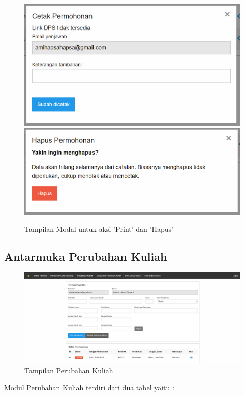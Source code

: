 \documentclass[a4paper,twoside]{article}
\begin{document}
\begin{enumerate}
		\begin{figure} [H]
			\centering  
			\includegraphics[scale=0.5]{Modal-Print-Manajemen-Cetak-Transkrip.png}  
			\includegraphics[scale=0.5]{Modal-Hapus-Manajemen-Cetak-Transkrip.png} 
			\caption{Tampilan Modal untuk aksi 'Print' dan 'Hapus'} 	
		\end{figure}
		
		
		\subsection{Antarmuka Perubahan Kuliah}
		\begin{figure} [H]
			\centering  
			\includegraphics[scale=0.5]{Tampilan-Perubahan-Kuliah.png}  
			\caption{Tampilan Perubahan Kuliah} 
		\end{figure}
		Modul Perubahan Kuliah terdiri dari dua tabel yaitu :
		

\end{enumerate}
\end{document}
